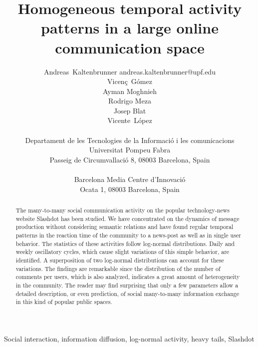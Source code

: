 \documentclass[twoside,11pt]{article}
\begin{document}
\title{Homogeneous temporal activity patterns in a large online communication space}

\author{\name Andreas~Kaltenbrunner \email andreas.kaltenbrunner@upf.edu \\
        \name Vicen\c{c}~G\'omez \\
        \name Ayman Moghnieh  \\
        \name Rodrigo Meza  \\
        \name Josep Blat \\
        \name Vicente~L\'opez \\\\
        \addr Departament de les Tecnologies de la Informaci\'o i les
comunicacions\\
Universitat Pompeu Fabra\\
Passeig de Circumval{\textperiodcentered}laci{\'o} 8, 08003 Barcelona, Spain\\\\
Barcelona Media Centre d'Innovaci{\'o}\\
Ocata 1, 08003 Barcelona, Spain}
\maketitle

\begin{abstract}The many-to-many social communication activity on the popular
technology-news website Slashdot has been studied. We have
concentrated on the dynamics of message production without considering
semantic relations and have found regular temporal patterns in the
reaction time of the community to a news-post as well as in single
user behavior. The statistics of these activities follow log-normal
distributions.  Daily and weekly oscillatory cycles, which cause
slight variations of this simple behavior, are identified.  A
superposition of two log-normal distributions can account for these
variations.  The findings are remarkable since the distribution of the
number of comments per users, which is also analyzed, indicates a
great amount of heterogeneity in the community.  The reader may find
surprising that only a few parameters
allow a detailed description, or even prediction, of social
many-to-many information exchange in this kind of popular public
spaces.
\end{abstract}

\begin{keywords}
  Social interaction, information diffusion,
log-normal activity, heavy tails, Slashdot
\end{keywords}
\end{document}

